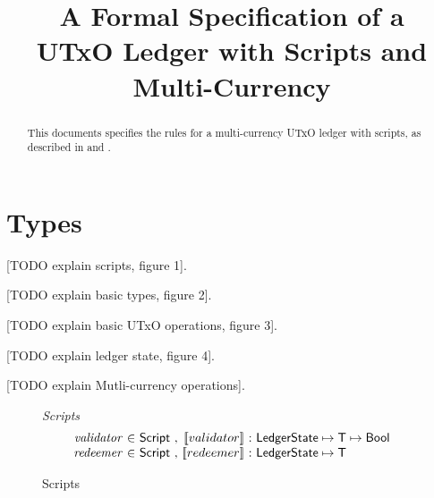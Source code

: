 \documentclass[11pt,a4paper]{article}
\newcommand{\var}[1]{\mathit{#1}}
\newcommand{\type}[1]{\mathsf{#1}}
\newcommand{\ScrEval}[1]{[\![ #1 ]\!]}
\begin{document}
\title{A Formal Specification of a \\
       UTxO Ledger with Scripts and Multi-Currency}

\author{}


\maketitle

\begin{abstract}
	This documents specifies the rules for a multi-currency UTxO ledger with scripts, as described in \cite{multi_currency} and \cite{utxo_scripts}.
\end{abstract}

\tableofcontents
\listoffigures

\section{Types}

[TODO explain scripts, figure 1].

[TODO explain basic types, figure 2].

[TODO explain basic UTxO operations, figure 3].

[TODO explain ledger state, figure 4].

[TODO explain Mutli-currency operations].

\begin{figure}
\emph{Scripts}
%
\begin{equation*}
\begin{array}{r@{~\in~}l@{~,~}r@{~:~}l}
  \var{validator}
& \type{Script}
& \ScrEval{validator}
& \type{LedgerState} \mapsto \type{T} \mapsto \type{Bool}
\\
  \var{redeemer}
& \type{Script}
& \ScrEval{redeemer}
& \type{LedgerState} \mapsto \type{T}
\end{array}
\end{equation*}
\caption{Scripts}
\label{fig:scripts}
\end{figure}
\end{document}
